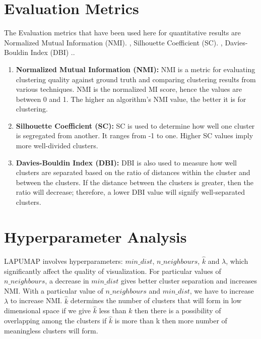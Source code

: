 \section{Evaluation Metrics}
The Evaluation metrics that have been used here for quantitative results are Normalized Mutual Information (NMI). \cite{estevez2009normalized}, Silhouette Coefficient (SC). \cite{rousseeuw1987graphical}, Davies-Bouldin Index (DBI) 
 .\cite{davies1979}.
\begin{enumerate}
    \item \textbf{Normalized Mutual Information (NMI):} NMI is a metric for evaluating clustering quality against ground truth and comparing clustering results from various techniques. NMI is the normalized MI score, hence the values are between 0 and 1. The higher an algorithm's NMI value, the better it is for clustering.
    \item \textbf{Silhouette Coefficient (SC):} SC is used to determine how well one cluster is segregated from another. It ranges from -1 to one. Higher SC values imply more well-divided clusters. 
    \item \textbf{Davies-Bouldin Index (DBI):} DBI is also used to measure how well clusters are separated based on the ratio of distances within the cluster and between the clusters. If the distance between the clusters is greater, then the ratio will decrease; therefore, a lower DBI value will signify well-separated clusters.
\end{enumerate}
\section{Hyperparameter Analysis}
LAPUMAP involves hyperparameters: $min\_dist$, $n\_neighbours$, $\hat{k}$ and $\lambda$, which significantly affect the quality of visualization. For particular values of $n\_neighbours$, a decrease in $min\_dist$ gives better cluster separation and increases NMI. With a particular value of $n\_neighbours$ and $min\_dist$, we have to increase $\lambda$ to increase NMI. $\hat{k}$ determines the number of clusters that will form in low dimensional space if we give $\hat{k}$ less than $k$ then there is a possibility of overlapping among the clusters if $\hat{k}$ is more than k then more number of meaningless clusters will form.  
